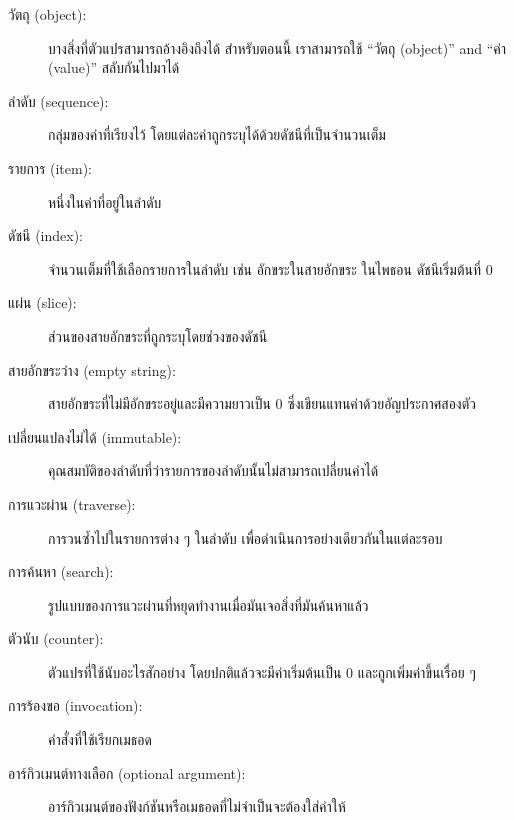 \begin{description}

\item[วัตถุ (object):] บางสิ่งที่ตัวแปรสามารถอ้างอิงถึงได้ สำหรับตอนนี้ เราสามารถใช้
``วัตถุ (object)'' and ``ค่า (value)'' สลับกันไปมาได้

\item[ลำดับ (sequence):] กลุ่มของค่าที่เรียงไว้ โดยแต่ละค่าถูกระบุได้ด้วยดัชนีที่เป็นจำนวนเต็ม

\item[รายการ (item):] หนึ่งในค่าที่อยู่ในลำดับ

\item[ดัชนี (index):] จำนวนเต็มที่ใช้เลือกรายการในลำดับ เช่น อักขระในสายอักขระ ในไพธอน
ดัชนีเริ่มต้นที่ 0 

\item[แผ่น (slice):] ส่วนของสายอักขระที่ถูกระบุโดยช่วงของดัชนี 

\item[สายอักขระว่าง (empty string):] สายอักขระที่ไม่มีอักขระอยู่และมีความยาวเป็น 0 ซึ่งเขียนแทนค่าด้วยอัญประกาศสองตัว

\item[เปลี่ยนแปลงไม่ได้ (immutable):] คุณสมบัติของลำดับที่ว่ารายการของลำดับนั้นไม่สามารถเปลี่ยนค่าได้ 

\item[การแวะผ่าน (traverse):] การวนซ้ำไปในรายการต่าง ๆ ในลำดับ เพื่อดำเนินการอย่างเดียวกันในแต่ละรอบ

\item[การค้นหา (search):] รูปแบบของการแวะผ่านที่หยุดทำงานเมื่อมันเจอสิ่งที่มันค้นหาแล้ว

\item[ตัวนับ (counter):] ตัวแปรที่ใช้นับอะไรสักอย่าง โดยปกติแล้วจะมีค่าเริ่มต้นเป็น 0 และถูกเพิ่มค่าขึ้นเรื่อย ๆ

\item[การร้องขอ (invocation):] คำสั่งที่ใช้เรียกเมธอด

\item[อาร์กิวเมนต์ทางเลือก (optional argument):] อาร์กิวเมนต์ของฟังก์ชันหรือเมธอดที่ไม่จำเป็นจะต้องใส่ค่าให้

\end{description}


